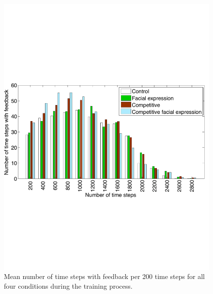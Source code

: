 \begin{figure}
\centering
\includegraphics[width=0.7\columnwidth]{FeedbackFrequency}
\caption{Mean number of time steps with feedback per 200 time steps for all four conditions during the training process.}
\label{feedback}
\end{figure}

